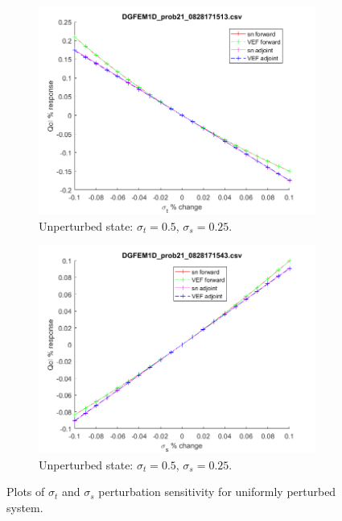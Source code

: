 \documentclass[12pt]{report}
\newcommand{\sigt}{\sigma_t}
\newcommand{\sigs}{\sigma_s}
\begin{document}
\begin{figure}[H]
\begin{subfigure}{.5\textwidth}
  \includegraphics[width=.98\linewidth]{figures/21sigtSens.png}
  \caption{Unperturbed state: $\sigt=0.5$, $\sigs=0.25$.}
  \label{fig:sfig3}
\end{subfigure}%
\begin{subfigure}{.5\textwidth}
  \centering
  \includegraphics[width=.98\linewidth]{figures/21sigsSens.png}
  \caption{Unperturbed state: $\sigt=0.5$, $\sigs=0.25$.}
  \label{fig:sfig6}
\end{subfigure}%
\caption{Plots of $\sigt$ and $\sigs$ perturbation sensitivity for uniformly perturbed system.}
\label{fig:fig}
\end{figure}
\end{document}
